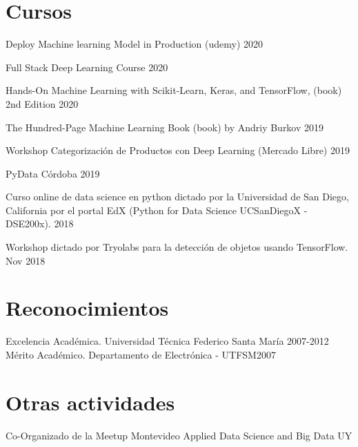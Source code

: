 \documentclass{article}
\renewenvironment{itemize}[1]{\begin{compactitem}#1}{\end{compactitem}}
\begin{document}
	\section{Cursos}
	\begin{itemize}[-]
		\item Deploy Machine learning Model in Production (udemy) \hfill 2020
		\item Full Stack Deep Learning Course \hfill 2020
		\item Hands-On Machine Learning with Scikit-Learn, Keras, and TensorFlow, (book) 2nd Edition \hfill 2020
		\item The Hundred-Page Machine Learning Book (book) by Andriy Burkov \hfill 2019   

		\item Workshop Categorización de Productos con Deep Learning (Mercado Libre) \hfill 2019
		\item PyData Córdoba \hfill 2019
		\item Curso online de data science en python dictado por la Universidad de San Diego, California por el portal EdX (Python for Data Science UCSanDiegoX - DSE200x). \hfill 2018
		\item  Workshop dictado por Tryolabs para la detección de objetos usando TensorFlow.  \hfill Nov 2018

	\end{itemize}

	\section{Reconocimientos}
	
	\ralewaysb Excelencia Académica. \raleway Universidad Técnica Federico Santa María \hfill 2007-2012
	\ralewaysb Mérito Académico. \raleway Departamento de Electrónica - UTFSM\hfill 2007
	
	\section{Otras actividades}
	Co-Organizado de la Meetup Montevideo Applied Data Science and Big Data UY
\end{document}

